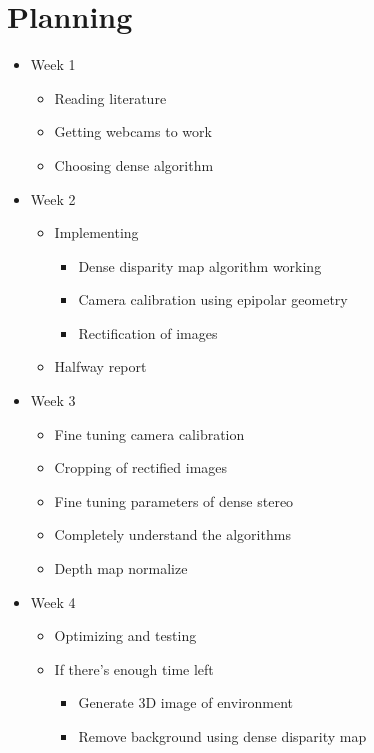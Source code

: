 \documentclass[a4paper]{article}
\begin{document}
\section{Planning}
\begin{itemize}
  \item Week 1
    \begin{itemize}
      \item Reading literature
      \item Getting webcams to work
      \item Choosing dense algorithm
    \end{itemize}
  \item Week 2
    \begin{itemize}
      \item Implementing
        \begin{itemize}
          \item Dense disparity map algorithm working
          \item Camera calibration using epipolar geometry
          \item Rectification of images
        \end{itemize}
      \item Halfway report
    \end{itemize}
    
  \item Week 3
    \begin{itemize}
    \item Fine tuning camera calibration
    \item Cropping of rectified images
    \item Fine tuning parameters of dense stereo
    \item Completely understand the algorithms
    \item Depth map normalize
    \end{itemize}

  \item Week 4
    \begin{itemize}
      \item Optimizing and testing
      \item If there's enough time left
        \begin{itemize}
          \item Generate 3D image of environment
          \item Remove background using dense disparity map
        \end{itemize}
    \end{itemize}
\end{itemize}
\end{document}
